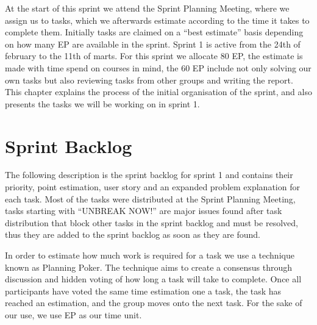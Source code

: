 At the start of this sprint we attend the Sprint Planning Meeting, where we assign us to tasks, which we afterwards estimate according to the time it takes to complete them.
Initially tasks are claimed on a ``best estimate'' basis depending on how many EP are available in the sprint.
Sprint 1 is active from the 24th of february to the 11th of marts. 
For this sprint we allocate 80 EP, the estimate is made with time spend on courses in mind, the 60 EP include not only solving our own tasks but also reviewing tasks from other groups and writing the report.
This chapter explains the process of the initial organisation of the sprint, and also presents the tasks we will be working on in sprint 1.

\section{Sprint Backlog}
The following description is the sprint backlog for sprint 1 and contains their priority, point estimation, user story and an expanded problem explanation for each task.
Most of the tasks were distributed at the Sprint Planning Meeting, tasks starting with ``UNBREAK NOW!'' are major issues found after task distribution that block other tasks in the sprint backlog and must be resolved, thus they are added to the sprint backlog as soon as they are found.

In order to estimate how much work is required for a task we use a technique known as Planning Poker.
The technique aims to create a consensus through discussion and hidden voting of how long a task will take to complete.
Once all participants have voted the same time estimation one a task, the task has reached an estimation, and the group moves onto the next task.
For the sake of our use, we use EP as our time unit.

